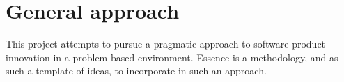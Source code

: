 
\section{General approach}
\label{sec:general_approach}

This project attempts to pursue a pragmatic approach to software product innovation in a problem based environment. Essence  is a methodology, and as such a template of ideas, to incorporate in such an approach.   


